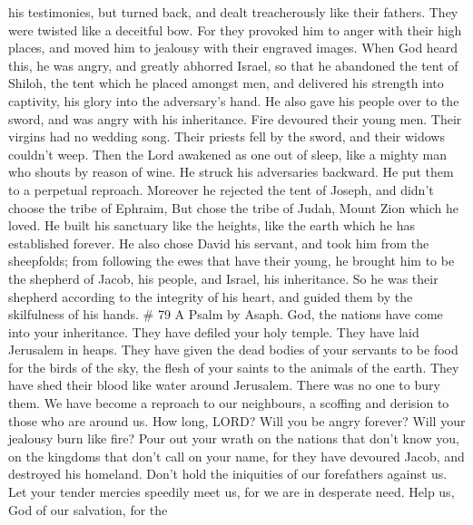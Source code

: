 his testimonies,  but turned back, and dealt
treacherously like their fathers. They were twisted like a deceitful
bow.  For they provoked him to anger with their high
places, and moved him to jealousy with their engraved images.
 When God heard this, he was angry, and greatly abhorred
Israel,  so that he abandoned the tent of Shiloh, the
tent which he placed amongst men,  and delivered his
strength into captivity, his glory into the adversary's hand.
 He also gave his people over to the sword, and was angry
with his inheritance.  Fire devoured their young men.
Their virgins had no wedding song.  Their priests fell by
the sword, and their widows couldn't weep.  Then the Lord
awakened as one out of sleep, like a mighty man who shouts by reason of
wine.  He struck his adversaries backward. He put them to
a perpetual reproach.  Moreover he rejected the tent of
Joseph, and didn't choose the tribe of Ephraim,  But
chose the tribe of Judah, Mount Zion which he loved.  He
built his sanctuary like the heights, like the earth which he has
established forever.  He also chose David his servant,
and took him from the sheepfolds;  from following the
ewes that have their young, he brought him to be the shepherd of Jacob,
his people, and Israel, his inheritance.  So he was their
shepherd according to the integrity of his heart, and guided them by the
skilfulness of his hands. \# 79 A Psalm by Asaph.  God,
the nations have come into your inheritance. They have defiled your holy
temple. They have laid Jerusalem in heaps.  They have
given the dead bodies of your servants to be food for the birds of the
sky, the flesh of your saints to the animals of the earth.
 They have shed their blood like water around Jerusalem.
There was no one to bury them.  We have become a reproach
to our neighbours, a scoffing and derision to those who are around us.
 How long, LORD? Will you be angry forever? Will your
jealousy burn like fire?  Pour out your wrath on the
nations that don't know you, on the kingdoms that don't call on your
name,  for they have devoured Jacob, and destroyed his
homeland.  Don't hold the iniquities of our forefathers
against us. Let your tender mercies speedily meet us, for we are in
desperate need.  Help us, God of our salvation, for the
